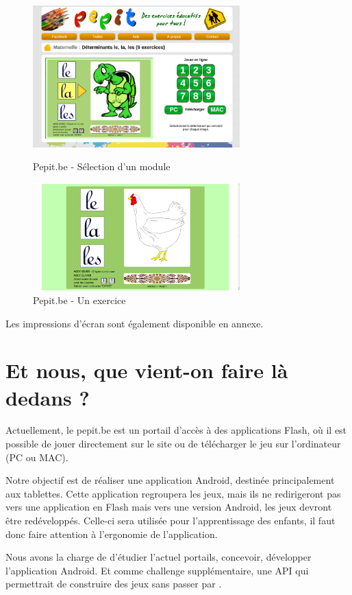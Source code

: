 \begin{figure}[H]
	\begin{minipage}[c]{.46\linewidth}
		\includegraphics[width=8cm]{images/pepit_be_modules}
		\caption{Pepit.be - Sélection d'un module}
		\label{Pepit.be - Sélection d'un module}
   	\end{minipage} \hfill
   	\begin{minipage}[c]{.46\linewidth}
      	\includegraphics[width=8cm]{images/pepit_be_practice}
		\caption{Pepit.be - Un exercice}
		\label{Pepit.be - Un exercice}
   	\end{minipage}
\end{figure}


Les impressions d'écran sont également disponible en annexe.

\section{Et nous, que vient-on faire là dedans ?}
Actuellement, le pepit.be est un portail d'accès à des applications Flash, où il est possible de jouer directement sur le site ou de télécharger le jeu sur l'ordinateur (PC ou MAC).


Notre objectif est de réaliser une application Android, destinée principalement aux tablettes. Cette application regroupera les jeux, mais ils ne redirigeront pas vers une application en Flash mais vers une version Android, les jeux devront être redéveloppés. Celle-ci sera utilisée pour l'apprentissage des enfants, il faut donc faire attention à l'ergonomie de l'application.


Nous avons la charge de d'étudier l'actuel portails, concevoir, développer l'application Android. Et comme challenge supplémentaire, une API qui permettrait de construire des jeux sans passer par \java{}.